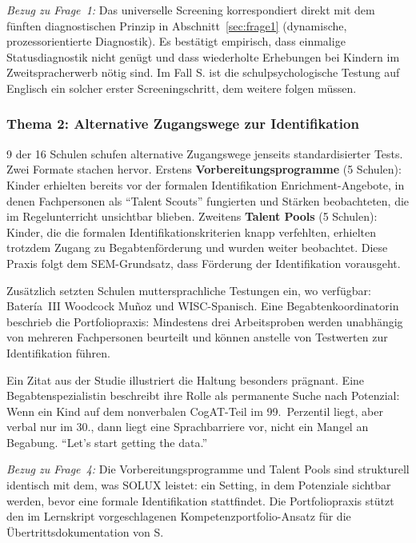 \documentclass[ngerman, a4paper]{article}
\begin{document}
\textit{Bezug zu Frage~1:} Das universelle Screening korrespondiert
direkt mit dem fünften diagnostischen Prinzip in
Abschnitt~\ref{sec:frage1} (dynamische, prozessorientierte Diagnostik).
Es bestätigt empirisch, dass einmalige Statusdiagnostik nicht genügt
\parencite{lemas2023begriffsklaerung} und dass wiederholte Erhebungen bei
Kindern im Zweitspracherwerb nötig sind. Im Fall S. ist die
schulpsychologische Testung auf Englisch ein solcher erster
Screeningschritt, dem weitere folgen müssen.

\subsubsection*{Thema 2: Alternative Zugangswege zur Identifikation}

9 der 16 Schulen schufen alternative Zugangswege jenseits standardisierter
Tests. Zwei Formate stachen hervor. Erstens \textbf{Vorbereitungsprogramme}
(5 Schulen): Kinder erhielten bereits vor der formalen Identifikation
Enrichment-Angebote, in denen Fachpersonen als \enquote{Talent Scouts}
fungierten und Stärken beobachteten, die im Regelunterricht unsichtbar
blieben. Zweitens \textbf{Talent Pools} (5 Schulen): Kinder, die die
formalen Identifikationskriterien knapp verfehlten, erhielten trotzdem
Zugang zu Begabtenförderung und wurden weiter beobachtet. Diese Praxis
folgt dem SEM-Grundsatz, dass Förderung der Identifikation vorausgeht.

Zusätzlich setzten Schulen muttersprachliche Testungen ein, wo verfügbar:
Batería~III Woodcock Muñoz und WISC-Spanisch. Eine
Begabtenkoordinatorin beschrieb die Portfoliopraxis: Mindestens drei
Arbeitsproben werden unabhängig von mehreren Fachpersonen beurteilt und
können anstelle von Testwerten zur Identifikation führen.

Ein Zitat aus der Studie illustriert die Haltung besonders prägnant. Eine
Begabtenspezialistin beschreibt ihre Rolle als permanente Suche nach
Potenzial: Wenn ein Kind auf dem nonverbalen CogAT-Teil im 99.~Perzentil
liegt, aber verbal nur im 30., dann liegt eine Sprachbarriere vor, nicht
ein Mangel an Begabung. \enquote{Let's start getting the data.}

\textit{Bezug zu Frage~4:} Die Vorbereitungsprogramme und Talent Pools
sind strukturell identisch mit dem, was SOLUX leistet: ein Setting, in dem
Potenziale sichtbar werden, bevor eine formale Identifikation stattfindet.
Die Portfoliopraxis stützt den im Lernskript vorgeschlagenen
Kompetenzportfolio-Ansatz für die Übertrittsdokumentation von S.
\end{document}
